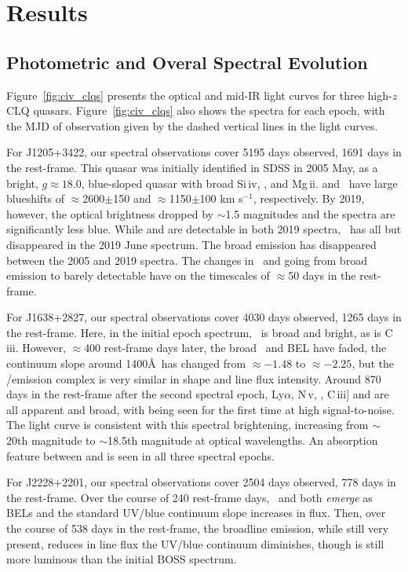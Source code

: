 \documentclass[fleqn,usenatbib]{mnras}
\begin{document}
\section{Results}
\subsection{Photometric and Overal Spectral Evolution}
Figure~\ref{fig:civ_clqs} presents the optical and mid-IR light
curves for three high-$z$ CLQ quasars.  Figure~\ref{fig:civ_clqs} also
shows the spectra for each epoch, with the MJD of observation given by
the dashed vertical lines in the light curves.

For J1205+3422, our spectral observations cover 5195 days observed,
1691 days in the rest-frame. This quasar was initially identified in
SDSS in 2005 May, as a bright, $g\approx18.0$, blue-sloped quasar with
broad Si\,{\sc iv}, \civ, \ciii and Mg\,{\sc ii}. \ciii and \civ\ have large
blueshifts of $\approx$2600$\pm$150 and $\approx$1150$\pm$100 km
s$^{-1}$, respectively.  By 2019, however, the optical brightness
dropped by $\sim$1.5 magnitudes and the spectra are significantly less
blue.  While \lya and \nv are detectable in both 2019 spectra, \civ\
has all but disappeared in the 2019 June spectrum.  The broad \ciii
emission has disappeared between the 2005 and 2019 spectra. The
changes in \civ\ and \ciii going from broad emission to barely
detectable have on the timescales of $\approx$50 days in the
rest-frame.

For J1638+2827, our spectral observations cover 4030 days observed,
1265 days in the rest-frame. Here, in the initial epoch spectrum,
\civ\ is broad and bright, as is C\,{\sc iii}. However, $\approx$400
rest-frame days later, the broad \civ\ and \ciii BEL have faded, the
continuum slope around 1400\AA\ has changed from $\approx-1.48$ to
$\approx-2.25$, but the \lya/\nv emission complex is very similar in
shape and line flux intensity. Around 870 days in the rest-frame after
the second spectral epoch, Ly$\alpha$, N\,{\sc v}, \civ, C\,{\sc iii}] and \mgii are all
apparent and broad, with \mgii being seen for the first time at high
signal-to-noise. The light curve is consistent with this spectral
brightening, increasing from $\sim$20th magnitude to $\sim$18.5th 
magnitude at optical wavelengths. An absorption feature between \lya
and \nv is seen in all three spectral epochs.

For J2228+2201, our spectral observations cover 2504 days observed,
778 days in the rest-frame. Over the course of 240 rest-frame days,
\civ\ and \ciii both {\it emerge} as BELs and the standard UV/blue
continuum slope increases in flux.  Then, over the course of 538 days
in the rest-frame, the broadline emission, while still very present,
reduces in line flux the UV/blue continuum diminishes, though is still
more luminous than the initial BOSS spectrum.
\end{document}
